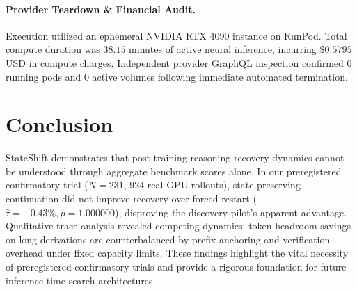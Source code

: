\documentclass[11pt]{article}
\begin{document}
\paragraph{Provider Teardown \& Financial Audit.}
Execution utilized an ephemeral NVIDIA RTX 4090 instance on RunPod. Total compute duration was $38.15$ minutes of active neural inference, incurring $\$0.5795$ USD in compute charges. Independent provider GraphQL inspection confirmed $0$ running pods and $0$ active volumes following immediate automated termination.

\section{Conclusion}
StateShift demonstrates that post-training reasoning recovery dynamics cannot be understood through aggregate benchmark scores alone. In our preregistered confirmatory trial ($N=231$, 924 real GPU rollouts), state-preserving continuation did not improve recovery over forced restart ($\hat{\tau} = -0.43\%, p=1.000000$), disproving the discovery pilot's apparent advantage. Qualitative trace analysis revealed competing dynamics: token headroom savings on long derivations are counterbalanced by prefix anchoring and verification overhead under fixed capacity limits. These findings highlight the vital necessity of preregistered confirmatory trials and provide a rigorous foundation for future inference-time search architectures.



\end{document}
